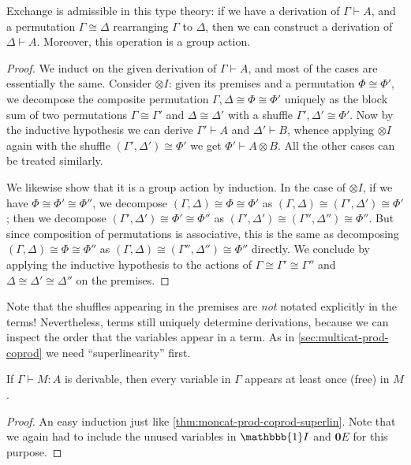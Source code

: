\documentclass{book}
\let\types\vdash
\def\unit{\mathbbb{1}}%
\def\zero{\mathbf{0}}
\let\tensor\otimes
\def\tensorI{\mathord{\tensor}I}
\begin{document}
\begin{lem}\label{thm:smc-exchadm}
  Exchange is admissible in this type theory: if we have a derivation of $\Gamma\types A$, and a permutation $\Gamma\cong \Delta$ rearranging $\Gamma$ to $\Delta$, then we can construct a derivation of $\Delta\types A$.
  Moreover, this operation is a group action.
\end{lem}
\begin{proof}
  We induct on the given derivation of $\Gamma\types A$, and most of the cases are essentially the same.
  Consider $\tensorI$: given its premises and a permutation $\Phi\cong\Phi'$, we decompose the composite permutation $\Gamma,\Delta\cong \Phi\cong\Phi'$ uniquely as the block sum of two permutations $\Gamma\cong \Gamma'$ and $\Delta\cong\Delta'$ with a shuffle $\Gamma',\Delta' \cong \Phi'$.
  Now by the inductive hypothesis we can derive $\Gamma'\types A$ and $\Delta'\types B$, whence applying $\tensorI$ again with the shuffle $(\Gamma',\Delta') \cong \Phi'$ we get $\Phi' \types A\tensor B$.
  All the other cases can be treated similarly.

  We likewise show that it is a group action by induction.
  In the case of $\tensorI$, if we have $\Phi\cong \Phi'\cong\Phi''$, we decompose $(\Gamma,\Delta)\cong \Phi\cong \Phi'$ as $(\Gamma,\Delta)\cong (\Gamma',\Delta')\cong\Phi'$; then we decompose $(\Gamma',\Delta')\cong\Phi' \cong \Phi''$ as $(\Gamma',\Delta')\cong (\Gamma'',\Delta'')\cong\Phi''$.
  But since composition of permutations is associative, this is the same as decomposing $(\Gamma,\Delta)\cong \Phi\cong \Phi''$ as $(\Gamma,\Delta)\cong (\Gamma'',\Delta'')\cong \Phi''$ directly.
  We conclude by applying the inductive hypothesis to the actions of $\Gamma\cong \Gamma'\cong \Gamma''$ and $\Delta\cong \Delta'\cong\Delta''$ on the premises.
\end{proof}

Note that the shuffles appearing in the premises are \emph{not} notated explicitly in the terms!
Nevertheless, terms still uniquely determine derivations, because we can inspect the order that the variables appear in a term.
As in \cref{sec:multicat-prod-coprod} we need ``superlinearity'' first.

\begin{lem}\label{thm:smc-superlin}
  If $\Gamma\types M:A$ is derivable, then every variable in $\Gamma$ appears at least once (free) in $M$.
\end{lem}
\begin{proof}
  An easy induction just like \cref{thm:moncat-prod-coprod-superlin}.
  Note that we again had to include the unused variables in $\unit I$ and $\zero E$ for this purpose.
\end{proof}
\end{document}
